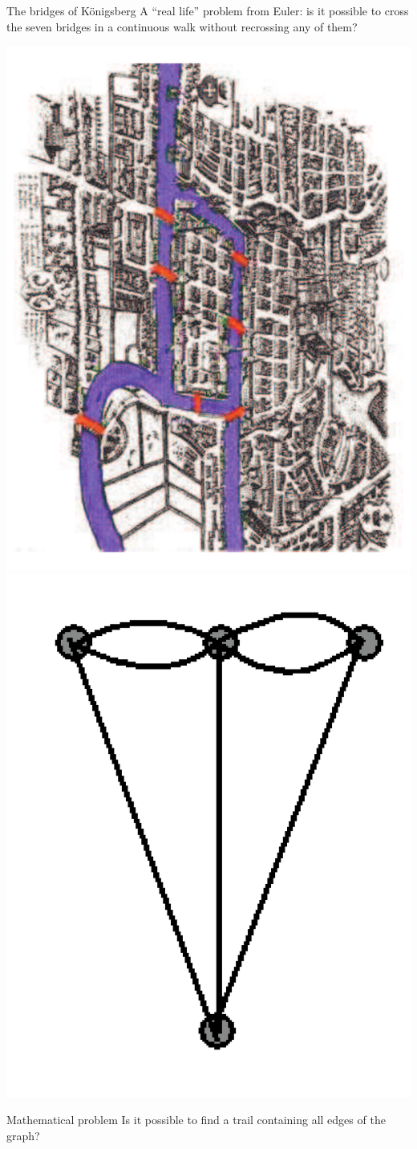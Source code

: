 \documentclass[aspectratio=43]{beamer}
\begin{document}
\begin{frame}{The bridges of K\"onigsberg}
	A ``real life'' problem from Euler: is it possible to cross the seven bridges in a continuous walk without recrossing any of them?
	\begin{center}
	\includegraphics[angle=90,width=.49\textwidth]{FIGS_slides/bridge_color}
	\includegraphics[angle=90,width=.49\textwidth]{FIGS_slides/graph_bridge}
	\end{center}
	\begin{block}{Mathematical problem}
	Is it possible to find a trail containing all edges of the graph?
	\end{block}
\end{frame}
\end{document}
